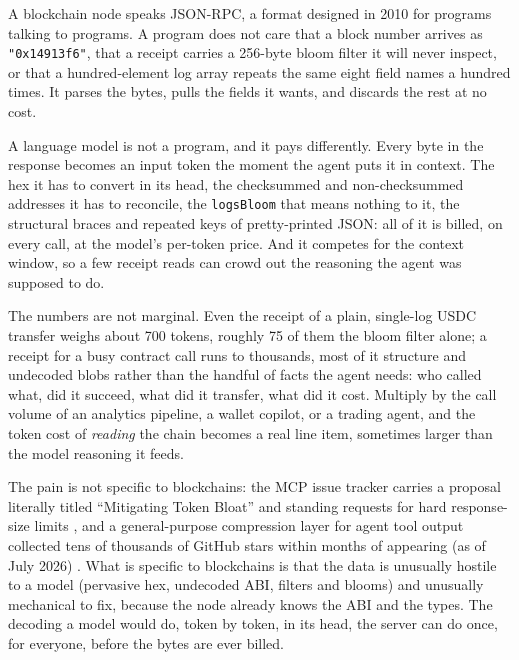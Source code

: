 \documentclass[11pt]{article}
\newcommand{\code}[1]{\texttt{#1}}
\begin{document}
A blockchain node speaks JSON-RPC, a format designed in 2010 for programs talking to programs. A program does not care that a block number arrives as \code{"0x14913f6"}, that a receipt carries a 256-byte bloom filter it will never inspect, or that a hundred-element log array repeats the same eight field names a hundred times. It parses the bytes, pulls the fields it wants, and discards the rest at no cost.

A language model is not a program, and it pays differently. Every byte in the response becomes an input token the moment the agent puts it in context. The hex it has to convert in its head, the checksummed and non-checksummed addresses it has to reconcile, the \code{logsBloom} that means nothing to it, the structural braces and repeated keys of pretty-printed JSON: all of it is billed, on every call, at the model's per-token price. And it competes for the context window, so a few receipt reads can crowd out the reasoning the agent was supposed to do.

The numbers are not marginal. Even the receipt of a plain, single-log USDC transfer weighs about 700 tokens, roughly 75 of them the bloom filter alone; a receipt for a busy contract call runs to thousands, most of it structure and undecoded blobs rather than the handful of facts the agent needs: who called what, did it succeed, what did it transfer, what did it cost. Multiply by the call volume of an analytics pipeline, a wallet copilot, or a trading agent, and the token cost of \emph{reading} the chain becomes a real line item, sometimes larger than the model reasoning it feeds.

The pain is not specific to blockchains: the MCP issue tracker carries a proposal literally titled ``Mitigating Token Bloat'' and standing requests for hard response-size limits \cite{mcpbloat, mcpsize}, and a general-purpose compression layer for agent tool output collected tens of thousands of GitHub stars within months of appearing (as of July 2026) \cite{headroom}. What is specific to blockchains is that the data is unusually hostile to a model (pervasive hex, undecoded ABI, filters and blooms) and unusually mechanical to fix, because the node already knows the ABI and the types. The decoding a model would do, token by token, in its head, the server can do once, for everyone, before the bytes are ever billed.
\end{document}

